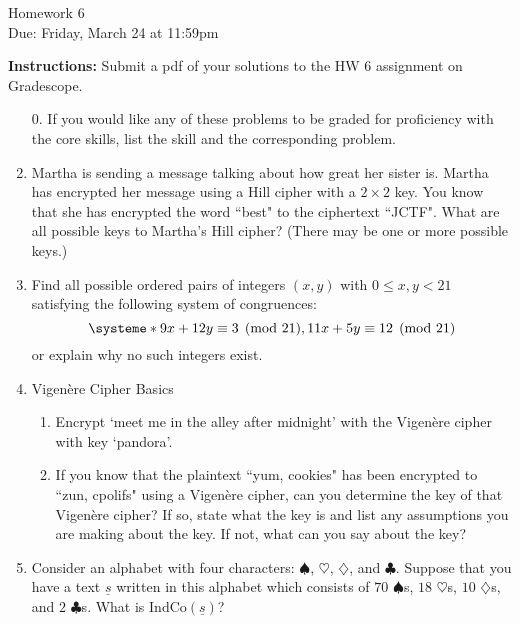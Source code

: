 \documentclass[12pt]{article}
\begin{document}
\begin{center}
{\Large Homework 6}\\
Due: Friday,  March 24 at 11:59pm\\


\end{center}
{\bf Instructions:} Submit a pdf of your solutions to the HW 6 assignment on Gradescope.  



\begin{enumerate}
\item[0.] If you would like any of these problems to be graded for proficiency with the core skills, list the skill and the corresponding problem. 

\item Martha is sending a message talking about how great her sister is.  Martha has encrypted her message using a Hill cipher with a $2\times 2$ key.  You know that she has encrypted the word ``best" to the ciphertext ``JCTF".  What are all possible keys to Martha's Hill cipher? (There may be one or more possible keys.)

\item Find all possible ordered pairs of integers $(x,y)$ with $0\le x,y<21$ satisfying the following system of congruences:
$$\systeme*{9x+12y\equiv 3\pmod{21}, 11x+5y\equiv 12\pmod{21}}$$ or explain why no such integers exist. 

\item Vigen\`{e}re Cipher Basics
\begin{enumerate}
\item Encrypt `meet me in the alley after midnight' with the Vigen\`{e}re cipher with key `pandora'.
\item If you know that the plaintext ``yum, cookies" has been encrypted to ``zun, cpolifs" using a Vigen\`{e}re cipher, can you determine the key of that Vigen\`{e}re cipher? If so, state what the key is and list any assumptions you are making about the key. If not, what can you say about the key? 
\end{enumerate}

\item Consider an alphabet with four characters: $\spadesuit$, $\heartsuit$, $\diamondsuit$, and $\clubsuit$.  Suppose that you have a text $\underline{s}$ written in this alphabet which consists of $70$ $\spadesuit$s,  $18$ $\heartsuit$s, $10$ $\diamondsuit$s, and $2$ $\clubsuit$s.  What is $\textrm{IndCo}(\underline{s})$?


\end{enumerate}
\end{document}
